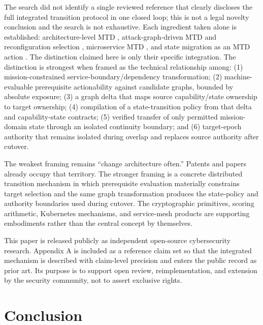 \documentclass[11pt,letterpaper]{article}
\begin{document}
The search did not identify a single reviewed reference that clearly discloses the full integrated transition protocol in one closed loop; this is not a legal novelty conclusion and the search is not exhaustive. Each ingredient taken alone is established: architecture-level MTD \cite{schmerl2014}, attack-graph-driven MTD and reconfiguration selection \cite{yoon2020,zangeneh2018,us8646085}, microservice MTD \cite{torkura2018,liu2023,ma2026}, and state migration as an MTD action \cite{mamaril2024}. The distinction claimed here is only their specific integration. The distinction is strongest when framed as the technical relationship among: (1) mission-constrained service-boundary/dependency transformation; (2) machine-evaluable prerequisite actionability against candidate graphs, bounded by absolute exposure; (3) a graph delta that maps source capability/state ownership to target ownership; (4) compilation of a state-transition policy from that delta and capability-state contracts; (5) verified transfer of only permitted mission-domain state through an isolated continuity boundary; and (6) target-epoch authority that remains isolated during overlap and replaces source authority after cutover.

The weakest framing remains ``change architecture often.'' Patents and papers already occupy that territory. The stronger framing is a concrete distributed transition mechanism in which prerequisite evaluation materially constrains target selection and the same graph transformation produces the state-policy and authority boundaries used during cutover. The cryptographic primitives, scoring arithmetic, Kubernetes mechanisms, and service-mesh products are supporting embodiments rather than the central concept by themselves.

This paper is released publicly as independent open-source cybersecurity research. Appendix A is included as a reference claim set so that the integrated mechanism is described with claim-level precision and enters the public record as prior art. Its purpose is to support open review, reimplementation, and extension by the security community, not to assert exclusive rights.

\section{Conclusion}
\end{document}
